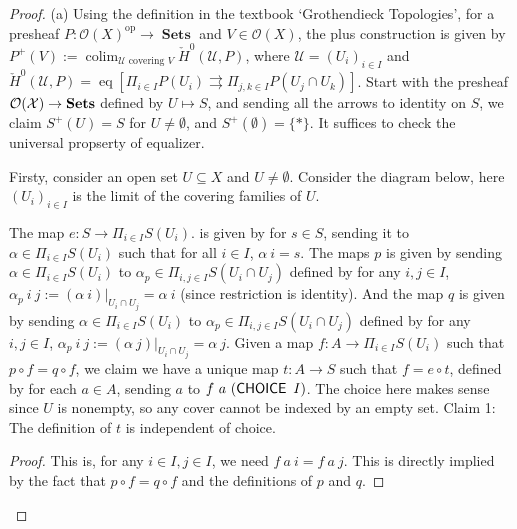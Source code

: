 \documentclass[a4paper]{article}
\DeclareMathOperator{\Sets}{\mathbf {Sets}}
\DeclareMathOperator{\op}{op}
\DeclareMathOperator{\CHOICE}{\sf CHOICE}
\DeclareMathOperator{\colim}{\text {colim}}
\DeclareMathOperator{\eqlz}{\text {eq}}
\begin{document}
\begin{proof}
    (a) Using the definition in the textbook `Grothendieck Topologies', for a presheaf $P:{\mathcal O}(X)^{\op}\to\Sets$ and $V\in {\mathcal O}(X)$, the plus construction is given by $P^+(V):=\colim_{\text{$\mathcal U$ covering $V$}}\check{H}^0({\mathcal U},P)$, where ${\mathcal U}=(U_i)_{i\in I}$ and $\check{H}^0({\mathcal U},P)=\eqlz[\Pi_{i\in I}P(U_i)\rightrightarrows\Pi_{j,k\in I}P(U_j\cap U_k)]$. 
    Start with the presheaf ${\cal O(X)}\to \Sets$ defined by $U\mapsto S$, and sending all the arrows to identity on $S$, we claim $S^+(U)=S$ for $U\ne\emptyset$, and $S^+(\emptyset)=\{*\}$. It suffices to check the universal propserty of equalizer. 
    
    Firsty, consider an open set $U\subseteq X$ and $U\ne\emptyset$. Consider the diagram below, here $(U_i)_{i\in I}$ is the limit of the covering families of $U$.
    \begin{center}
    \end{center}
    The map $e:S\to \Pi_{i\in I}S(U_i)$. is given by for $s\in S$, sending it to $\alpha\in \Pi_{i\in I}S(U_i)$ such that for all $i\in I$, $\alpha \ i = s$. The maps $p$ is given by sending $\alpha\in \Pi_{i\in I}S(U_i)$ to $\alpha_p\in \Pi_{i,j\in I}S(U_i\cap U_j)$ defined by for any $i,j\in I$, $\alpha_p\ i\ j:= (\alpha\ i)|_{U_i\cap U_j}=\alpha \ i$ (since restriction is identity). And the map $q$ is given by sending $\alpha\in \Pi_{i\in I}S(U_i)$ to $\alpha_p\in \Pi_{i,j\in I}S(U_i\cap U_j)$ defined by for any $i,j\in I$, $\alpha_p\ i\ j:= (\alpha\ j)|_{U_i\cap U_j}=\alpha \ j$.\newline
    Given a map $f: A\to \Pi_{i\in I}S(U_i)$ such that $p\circ f = q\circ f$, we claim we have a unique map $t:A\to S$ such that $f=e\circ t$, defined by for each $a\in A$, sending $a$ to $f \ a \ (\CHOICE \ I)$. The choice here makes sense since $U$ is nonempty, so any cover cannot be indexed by an empty set. \newline
    Claim 1: The definition of $t$ is independent of choice.
    \begin{proof}
        This is, for any $i\in I, j\in I$, we need $f \ a \ i = f \ a \ j$. This is directly implied by the fact that $p\circ f = q\circ f$ and the definitions of $p$ and $q$.
    \end{proof}


\end{proof}
\end{document}
